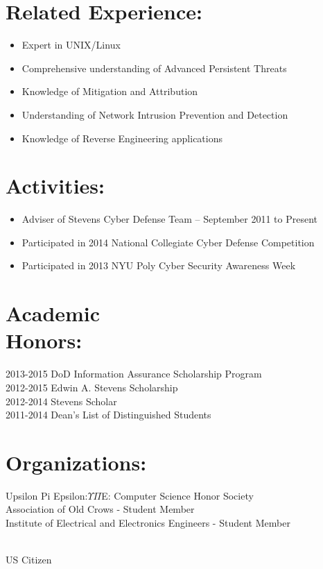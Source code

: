 \documentclass[mm]{res}
\begin{document}
\begin{resume}
\section{Related Experience:}
\begin{itemize} \itemsep -2pt %
\item Expert in UNIX/Linux
\item Comprehensive understanding of Advanced Persistent Threats
\item Knowledge of Mitigation and Attribution
\item Understanding of Network Intrusion Prevention and Detection
\item Knowledge of Reverse Engineering applications
\end{itemize}

\section{Activities:}
\begin{itemize} \itemsep -2pt
\item Adviser of Stevens Cyber Defense Team – September 2011 to Present
\item Participated in 2014 National Collegiate Cyber Defense  Competition
\item Participated in 2013 NYU Poly Cyber Security Awareness Week
\end{itemize}

\section{Academic \\ Honors:} 
2013-2015 DoD Information Assurance Scholarship Program \\
2012-2015 Edwin A. Stevens Scholarship  \\
2012-2014 Stevens Scholar \\
2011-2014 Dean's List of Distinguished Students

\section{Organizations:}
Upsilon Pi Epsilon:$\Upsilon$$\Pi$E: Computer Science Honor Society \\
Association of Old Crows - Student Member \\ 
Institute of Electrical and Electronics Engineers - Student Member\\

\end{resume} 
\centerline{\\ US Citizen}
\end{document}
